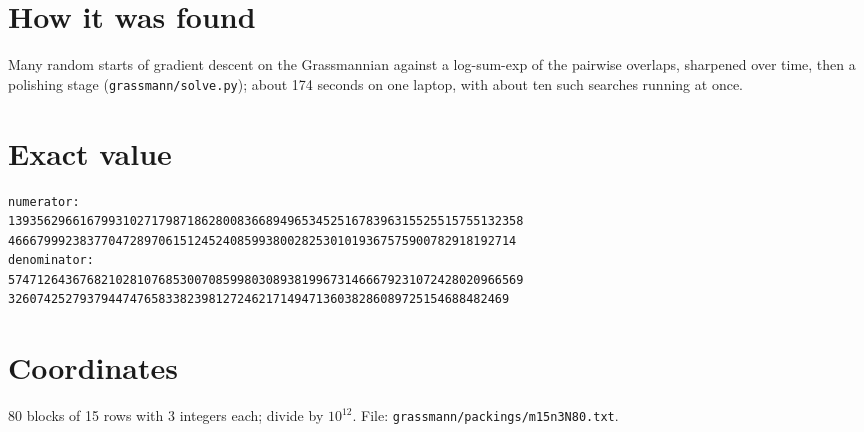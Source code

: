 \documentclass[11pt,a4paper]{article}
\begin{document}
\section{How it was found}
Many random starts of gradient descent on the Grassmannian against a log-sum-exp of the pairwise overlaps, sharpened over time, then a polishing stage (\texttt{grassmann/solve.py}); about 174 seconds on one laptop, with about ten such searches running at once.


\appendix
\section{Exact value}
{\small
\begin{verbatim}
numerator:
139356296616799310271798718628008366894965345251678396315525515755132358
46667999238377047289706151245240859938002825301019367575900782918192714
denominator:
574712643676821028107685300708599803089381996731466679231072428020966569
3260742527937944747658338239812724621714947136038286089725154688482469
\end{verbatim}}

\section{Coordinates}
80 blocks of 15 rows with 3 integers each; divide by $10^{12}$. File: \texttt{grassmann/packings/m15n3N80.txt}.
{\tiny
\begin{multicols}{3}
\end{multicols}}
\end{document}
